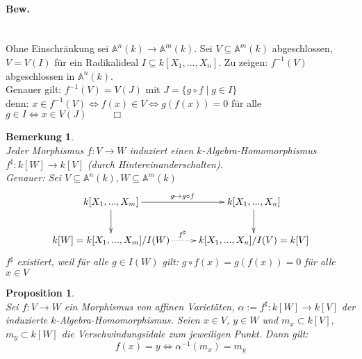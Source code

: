 \documentclass[a4paper,12pt]{report}
\theoremstyle{break}
\newtheorem{Bem}[Def]{Bemerkung}
\newtheorem{Prop}[Def]{Proposition}
\theoremstyle{nonumberbreak}
\theoremstyle{nonumberplain}
\begin{document}
\paragraph{Bew.}~\\
Ohne Einschränkung sei $\mathbb{A}^n(k)\rightarrow\mathbb{A}^m(k)$. Sei $V\subseteq \mathbb{A}^m(k)$ abgeschlossen, $V=V(I)$ für ein Radikalideal $I\subseteq k[X_1,...,X_n]$. Zu zeigen: $f^{-1}(V)$ abgeschlossen in $\mathbb{A}^n(k)$.\\
Genauer gilt: $f^{-1}(V)=V(J)$ mit $J=\{g\circ f \mid g\in I\}$\\
denn: $x\in f^{-1}(V) \Leftrightarrow f(x)\in V \Leftrightarrow g(f(x))=0$ für alle $g\in I\Leftrightarrow x\in V(J) ~~~~~~~~~~~\Box$
\begin{Bem}~\\
Jeder Morphismus $f:V\rightarrow W$ induziert einen $k$-Algebra-Homomorphismus $f^{\sharp}: k[W]\rightarrow k[V]$ (durch Hintereinanderschalten).\\
Genauer: Sei $V\subseteq \mathbb{A}^n(k), W\subseteq \mathbb{A}^m(k)$
\[
\begin{xy}
\xymatrix{
k[X_1,...,X_m]\ar[d]\ar[r]^{g\mapsto g\circ f}&k[X_1,...,X_n]\ar[d]\\
k[W]=k[X_1,...,X_m]/I(W)\ar@{.>}[r]^{f^{\sharp}}&k[X_1,...,X_n]/I(V)=k[V]
}
\end{xy}
\]
$f^{\sharp}$ existiert, weil für alle $g\in I(W)$ gilt: $g\circ f(x) = g(f(x))=0$ für alle $x\in V$
\end{Bem}
\begin{Prop}~\\
Sei $f: V\rightarrow W$ ein Morphismus von affinen Varietäten, $\alpha:= f^{\sharp}: k[W]\rightarrow k[V]$ der induzierte $k$-Algebra-Homomorphismus. Seien $x\in V$, $y\in W$ und $m_x\subset k[V]$, $m_y\subset k[W]$ die Verschwindungsidale zum jeweiligen Punkt. Dann gilt:
$$f(x)=y\Leftrightarrow \alpha^{-1}(m_x)= m_y$$
\end{Prop}
\end{document}
